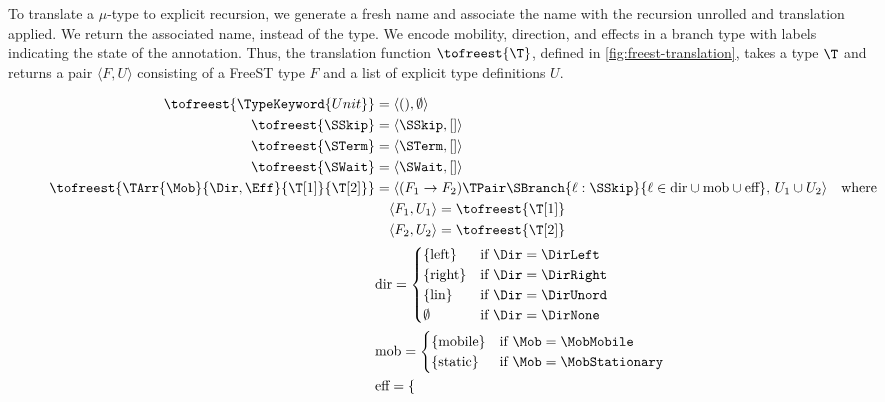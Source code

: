 To translate a $\mu$-type to explicit recursion, we generate a fresh name and
associate the name with the recursion unrolled and translation applied.
We return the associated name, instead of the type.
We encode mobility, direction, and effects in a branch type with labels
indicating the state of the annotation.
Thus, the translation function $\tofreest{\T}$, defined in
\cref{fig:freest-translation}, takes a type $\T$ and returns a pair
$\langle F,U\rangle$ consisting of a FreeST type $F$ and a list of explicit
type definitions $U$.

\begin{figure}[tp]
  \footnotesize
  \setlength{\jot}{0.1ex}
  \begin{align*}
    \tofreest{\TypeKeyword{Unit}}
      & = \langle (), \emptyset \rangle \\
    \tofreest{\SSkip}
      & = \langle \SSkip, [] \rangle \\
    \tofreest{\STerm}
      & = \langle \STerm, [] \rangle \\
    \tofreest{\SWait}
      & = \langle \SWait, [] \rangle \\
    \tofreest{\TArr{\Mob}{\Dir, {\Eff}}{\T[1]}{\T[2]}}
      & = \langle (F_1 \to F_2) \TPair \SBranch {\ell : \SSkip} {\ell \in \text{dir} \cup \text{mob} \cup \text{eff}},\,
        U_1 \cup U_2 \rangle \quad \text{where} \\
      & \quad \langle F_1, U_1 \rangle = \tofreest{\T[1]} \\
      & \quad \langle F_2, U_2 \rangle = \tofreest{\T[2]} \\
      & \text{dir} = \begin{cases}
        \{ \text{left} \} & \text{if } \Dir = \DirLeft \\
        \{ \text{right} \} & \text{if } \Dir = \DirRight \\
        \{ \text{lin} \} & \text{if } \Dir = \DirUnord \\
        \emptyset & \text{if } \Dir = \DirNone \\
      \end{cases} \\
      & \text{mob} = \begin{cases}
        \{ \text{mobile} \} & \text{if } \Mob = \MobMobile \\
        \{ \text{static} \} & \text{if } \Mob = \MobStationary \\
      \end{cases} \\
      & \text{eff} = \begin{cases}

\end{cases}
\end{align*}
\end{figure}
